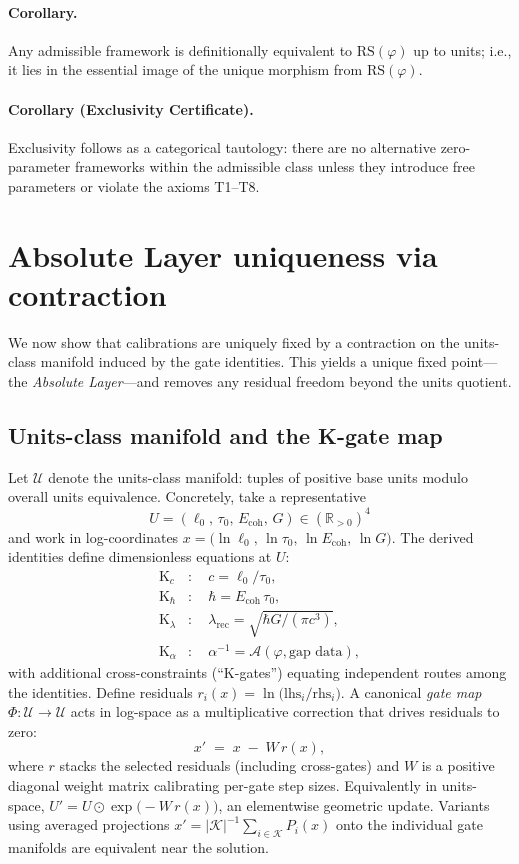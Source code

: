 \documentclass[11pt]{article}
\begin{document}
\paragraph{Corollary.} Any admissible framework is definitionally equivalent to \(\mathrm{RS}(\varphi)\) up to units; i.e., it lies in the essential image of the unique morphism from \(\mathrm{RS}(\varphi)\).

\paragraph{Corollary (Exclusivity Certificate).} Exclusivity follows as a categorical tautology: there are no alternative zero\mbox{-}parameter frameworks within the admissible class unless they introduce free parameters or violate the axioms T1--T8.

\section{Absolute Layer uniqueness via contraction}
We now show that calibrations are uniquely fixed by a contraction on the units\mbox{-}class manifold induced by the gate identities. This yields a unique fixed point---the \emph{Absolute Layer}---and removes any residual freedom beyond the units quotient.

\subsection{Units\mbox{-}class manifold and the K\mbox{-}gate map}
Let \(\mathcal{U}\) denote the units\mbox{-}class manifold: tuples of positive base units modulo overall units equivalence. Concretely, take a representative
\[
  U=(\ell_0,\, \tau_0,\, E_{\mathrm{coh}},\, G)\in (\mathbb{R}_{>0})^4
\]
and work in log\mbox{-}coordinates \(x=\bigl(\ln \ell_0,\, \ln \tau_0,\, \ln E_{\mathrm{coh}},\, \ln G\bigr)\). The derived identities define dimensionless equations at \(U\):
\begin{align*}
  \mathrm{K}_c&:\quad c=\ell_0/\tau_0,\\
  \mathrm{K}_{\hbar}&:\quad \hbar=E_{\mathrm{coh}}\,\tau_0,\\
  \mathrm{K}_{\lambda}&:\quad \lambda_{\mathrm{rec}}=\sqrt{\hbar G/(\pi c^3)},\\
  \mathrm{K}_{\alpha}&:\quad \alpha^{-1}=\mathcal{A}(\varphi,\text{gap data}),
\end{align*}
with additional cross\mbox{-}constraints (``K\mbox{-}gates'') equating independent routes among the identities. Define residuals \(r_i(x)=\ln\bigl(\mathrm{lhs}_i/\mathrm{rhs}_i\bigr)\). A canonical \emph{gate map} \(\Phi\colon \mathcal{U}\to\mathcal{U}\) acts in log\mbox{-}space as a multiplicative correction that drives residuals to zero:
\[
  x'\;=\;x\; -\; W\, r(x),
\]
where \(r\) stacks the selected residuals (including cross\mbox{-}gates) and \(W\) is a positive diagonal weight matrix calibrating per\mbox{-}gate step sizes. Equivalently in units\mbox{-}space, \(U' = U\odot \exp\bigl(-W\, r(x)\bigr)\), an elementwise geometric update. Variants using averaged projections \(x' = |\mathcal{K}|^{-1}\sum_{i\in\mathcal{K}} P_i(x)\) onto the individual gate manifolds are equivalent near the solution.
\end{document}
